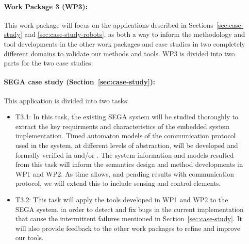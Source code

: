 \paragraph{Work Package 3 (WP3):}  This work package will focus on the applications described in Sections~\ref{sec:case-study} and \ref{sec:case-study-robots}, as both a way to inform the methodology and tool developments in the other work packages and case studies in two completely different domains to validate our methods and tools.
WP3 is divided into two parts for the two case studies:
\paragraph{SEGA case study (Section~\ref{sec:case-study}):} This application is divided into two tasks:
\noindent  \begin{itemize}[labelsep=3pt,leftmargin=12pt]
  \item T3.1: In this task, the existing SEGA system will be
    studied thoroughly to extract the key requirments and
    characteristics of the embedded system implementation.  Timed
    automaton models of the communication protocol used in the system,
    at different levels of abstraction, will be developed and formally
    verified in \uppaal and/or \prism. The system information and models
    resulted from this task will inform the semantics design and method
    developments in WP1 and WP2. As time allows, and pending results
    with communication protocol, we will extend this to include sensing
    and control elements.
  \item T3.2: This task will apply the tools developed in WP1 and WP2
    to the SEGA system, in order to detect and fix bugs in the current
    implementation that cause the intermittent failures mentioned in
    Section~\ref{sec:case-study}.  It will also provide feedback to
    the other work packages to refine and improve our tools.
  \end{itemize}


